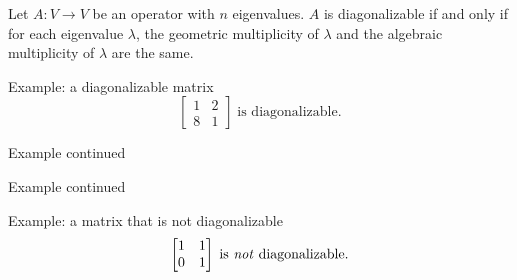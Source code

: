 \documentclass [aspectratio=169]{beamer}
\newcommand{\R}{{\mathbb{R}}}
\newcommand{\C}{{\mathbb{C}}}
\begin{document}
\begin{frame}
\begin{theorem}
Let $A:V\to V$ be an operator with $n$ eigenvalues. $A$ is diagonalizable if and only if for each eigenvalue $\lambda$, the geometric multiplicity of $\lambda$ and the algebraic multiplicity of $\lambda$ are the same.
\end{theorem}
\end{frame}


\begin{frame}{Example: a diagonalizable matrix}
$$ \begin{bmatrix} 1 & 2 \\ 8 & 1\end{bmatrix} \; \text{is diagonalizable.}$$
\vspace{5cm}
\end{frame}


\begin{frame}{Example continued}

\end{frame}

\begin{frame}{Example continued}

\end{frame}


\begin{frame}{Example: a matrix that is not diagonalizable}
$$ \begin{bmatrix} 1 & 1 \\ 0 & 1\end{bmatrix} \; \text{is \emph{not} diagonalizable.}$$
\vspace{5cm}
\end{frame}

%
%
%
\end{document}
